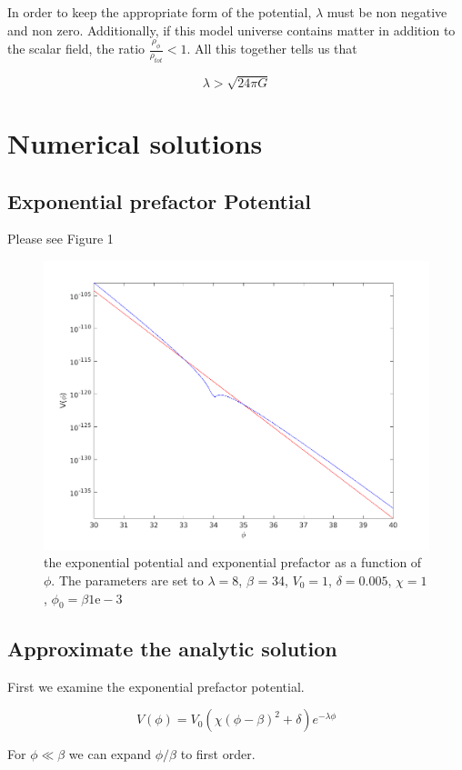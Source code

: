 \documentclass[12pt]{article}
\begin{document}
In order to keep the appropriate form of the potential, $\lambda$ must be non negative and non zero. Additionally, if this model universe contains matter in addition to the scalar field, the ratio  $\frac{\rho_{\phi}}{ \rho_{tot}} < 1$. All this together tells us that

$$  \lambda > \sqrt{24 \pi G} $$ 

\section{Numerical solutions}
\subsection{Exponential prefactor Potential}
Please see Figure 1
\begin{figure}
\centering
\includegraphics[width=5in]{potential.png}
\caption{the exponential potential and exponential prefactor as a function of $\phi$. The parameters are set to $\lambda = 8$, $\beta$ = 34, $V_0 = 1$, $\delta = 0.005$, $\chi = 1$, $\phi_0 = \beta 1\mathrm{e}-3$}
\end{figure}

\subsection{Approximate the analytic solution}
First we examine the exponential prefactor potential.

$$ V(\phi) = V_{0}(\chi(\phi - \beta)^{2} + \delta)e^{-\lambda \phi}$$

For $\phi \ll \beta$ we can expand  $\phi / \beta$ to first order.
\end{document}

